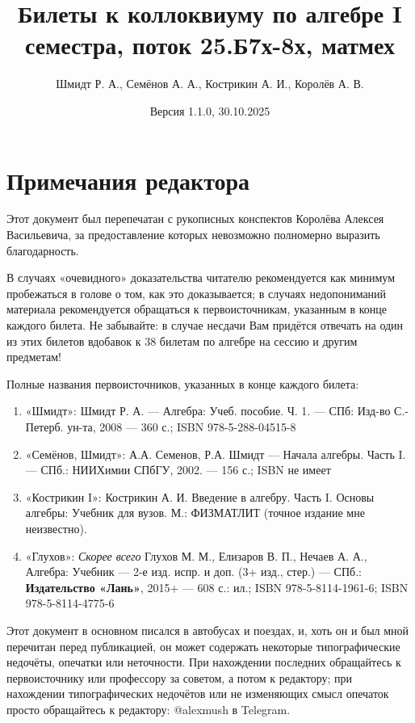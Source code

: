 \documentclass{article}
\title{Билеты к коллоквиуму по алгебре I семестра, поток 25.Б7х-8х, матмех}
\author{Шмидт Р. А., Семёнов А. А., Кострикин А. И., Королёв А. В.}
\date{Версия 1.1.0, 30.10.2025}
\begin{document}
\maketitle

\tableofcontents

\sloppy



\newpage
\section*{Примечания редактора}
Этот документ был перепечатан с рукописных конспектов Королёва Алексея Васильевича, за предоставление которых невозможно полномерно выразить благодарность.

В случаях «очевидного» доказательства читателю рекомендуется как минимум пробежаться в голове о том, как это доказывается; в случаях недопониманий материала рекомендуется обращаться к первоисточникам, указанным в конце каждого билета. Не забывайте: в случае несдачи Вам придётся отвечать на один из этих билетов вдобавок к 38 билетам по алгебре на сессию и другим предметам!

Полные названия первоисточников, указанных в конце каждого билета:
\begin{enumerate}
\item «Шмидт»: Шмидт Р. А. --- Алгебра: Учеб. пособие. Ч. 1. --- СПб: Изд-во С.-Петерб. ун-та, 2008 --- 360 с.; ISBN 978-5-288-04515-8
\item «Семёнов, Шмидт»: А.А. Семенов, Р.А. Шмидт --- Начала алгебры. Часть I. --- СПб.: НИИХимии СПбГУ, 2002. --- 156 с.; ISBN не имеет
\item «Кострикин I»: Кострикин А. И. Введение в алгебру. Часть I. Основы алгебры: Учебник для вузов. М.: ФИЗМАТЛИТ (точное издание мне неизвестно).
\item «Глухов»: \textit{Скорее всего} Глухов М. М., Елизаров В. П., Нечаев А. А., Алгебра: Учебник --- 2-е изд. испр. и доп. (3+ изд., стер.) --- СПб.: \textbf{Издательство «Лань»}, 2015+ --- 608 с.: ил.; ISBN 978-5-8114-1961-6; ISBN 978-5-8114-4775-6
\end{enumerate}

Этот документ в основном писался в автобусах и поездах, и, хоть он и был мной перечитан перед публикацией, он может содержать некоторые типографические недочёты, опечатки или неточности. При нахождении последних обращайтесь к первоисточнику или профессору за советом, а потом к редактору; при нахождении типографических недочётов или не изменяющих смысл опечаток просто обращайтесь к редактору: @alexmush в Telegram.
\end{document}
